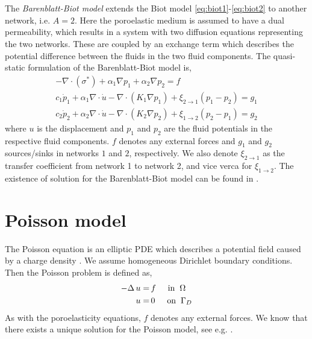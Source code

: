 \\
\\
The \textit{Barenblatt-Biot model} \cite{Barenblatt1960,Barenblatt1963, elsworth, berryman1995} extends the Biot model \eqref{eq:biot1}-\eqref{eq:biot2} to another network, i.e. $A=2$. Here the poroelastic medium is assumed to have a dual permeability, which results in a system with two diffusion equations representing the two networks. These are coupled by an exchange term which describes the potential difference between the fluids in the two fluid components. The quasi-static formulation of the Barenblatt-Biot model is,
\begin{align} \label{math_model:mpet2_u}
- \nabla \cdot(\sigma^{\ast}) +  \alpha_1 \nabla p_1 +  \alpha_2 \nabla p_2 = f \\
c_1\dot{p}_1 + \alpha_1 \nabla \cdot \dot{u} - \nabla \cdot (K_1 \nabla p_1) + \xi_{2\to 1}(p_1-p_2) = g_1 \label{math_model:mpet2_p1}\\
c_2\dot{p}_2 + \alpha_2 \nabla \cdot \dot{u} - \nabla \cdot(K_2 \nabla p_2) + \xi_{1\to 2}(p_2-p_1) = g_2 \label{math_model:mpet2_p2}
\end{align}
where $u$ is the displacement and $p_1$ and $p_2$ are the fluid potentials in the respective fluid components. $f$ denotes any external forces and $g_1$ and $g_2$ sources/sinks in networks $1$ and $2$, respectively. We also denote $\xi_{2\to 1}$ as the transfer coefficient from network 1 to network 2, and vice verca for $\xi_{1\to 2}$. The existence of solution for the Barenblatt-Biot model can be found in \cite{showalter, showalter2002}.

\section{Poisson model} \label{section:poisson}
The Poisson equation is an elliptic PDE which describes a potential field caused by a charge density \cite{bitsadze}. We assume homogeneous Dirichlet boundary conditions. Then the Poisson problem is defined as,
\\
\begin{align} \label{eq:poisson_strong_form}
- \Delta \, u = & \, f \hspace{0.5cm} \textnormal{in} \hspace{0.2cm} \Omega \\
u = & \, 0 \hspace{0.5cm} \textnormal{on} \hspace{0.2cm}\Gamma_D
\end{align}
As with the poroelasticity equations, $f$ denotes any external forces. We know that there exists a unique solution for the Poisson model, see e.g. \cite{evans}.